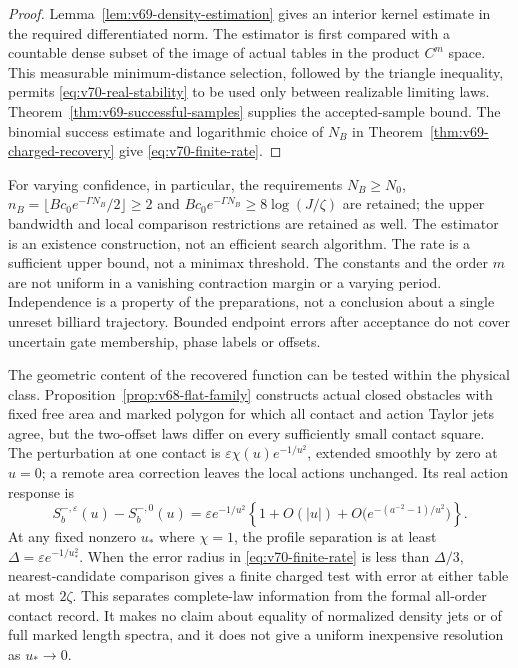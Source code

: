 \begin{proof}
Lemma~\ref{lem:v69-density-estimation} gives an interior kernel estimate
in the required differentiated norm.  The estimator is first compared
with a countable dense subset of the image of actual tables in the
product $C^m$ space.  This measurable minimum-distance selection,
followed by the triangle inequality, permits
\eqref{eq:v70-real-stability} to be used only between realizable
limiting laws.  Theorem~\ref{thm:v69-successful-samples} supplies the
accepted-sample bound.  The binomial success estimate and logarithmic
choice of $N_B$ in Theorem~\ref{thm:v69-charged-recovery} give
\eqref{eq:v70-finite-rate}.
\end{proof}

For varying confidence, in particular, the requirements
$N_B\ge N_0$, $n_B=\lfloor Bc_0e^{-\Gamma N_B}/2\rfloor\ge2$
and $Bc_0e^{-\Gamma N_B}\ge8\log(J/\zeta)$ are retained; the upper
bandwidth and local comparison restrictions are retained as well.
The estimator is an existence construction, not an efficient search
algorithm.  The rate is a sufficient upper bound, not a minimax
threshold.  The constants and the order $m$ are not uniform in a
vanishing contraction margin or a varying period.  Independence is a
property of the preparations, not a conclusion about a single unreset
billiard trajectory.  Bounded endpoint errors after acceptance do not
cover uncertain gate membership, phase labels or offsets.

The geometric content of the recovered function can be tested within
the physical class.  Proposition~\ref{prop:v68-flat-family} constructs
actual closed obstacles with fixed free area and marked polygon for which
all contact and action Taylor jets agree, but the two-offset laws differ
on every sufficiently small contact square.  The perturbation at one
contact is $\varepsilon\chi(u)e^{-1/u^2}$, extended smoothly by zero
at $u=0$; a remote area correction leaves the local actions unchanged.
Its real action response is
\[
 S_b^{-,\varepsilon}(u)-S_b^{-,0}(u)
  =\varepsilon e^{-1/u^2}\left\{1+O(|u|)
       +O\bigl(e^{-(a^{-2}-1)/u^2}\bigr)\right\}.
\]
At any fixed nonzero $u_*$ where $\chi=1$, the profile separation is
at least $\Delta=\varepsilon e^{-1/u_*^2}$.  When the error radius in
\eqref{eq:v70-finite-rate} is less than $\Delta/3$, nearest-candidate
comparison gives a finite charged test with error at either table at
most $2\zeta$.  This separates complete-law information from the
formal all-order contact record.  It makes no claim about equality of
normalized density jets or of full marked length spectra, and it does
not give a uniform inexpensive resolution as $u_*\to0$.

